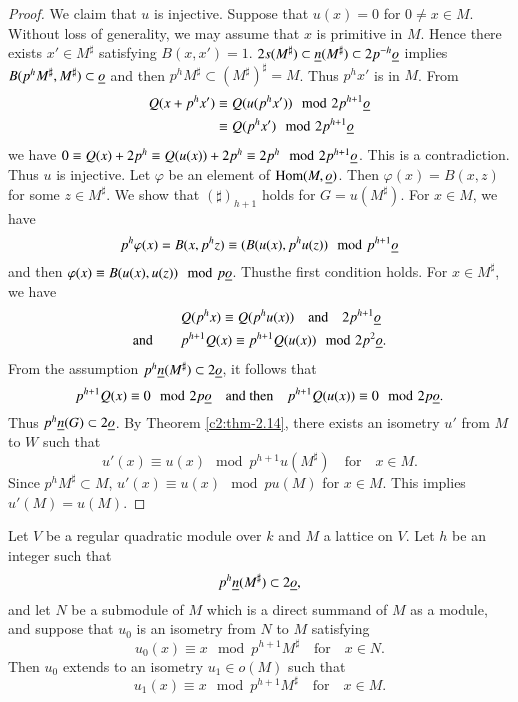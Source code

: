 \begin{proof}
We claim that $u$ is injective. Suppose that $u(x)=0$ for $0\neq x\in
M$. Without loss of generality, we may assume that $x$ is primitive in
$M$. Hence there exists $x'\in M^{\sharp}$ satisfying
$B(x,x')=1$. $2s(M^{\sharp})\subset\underline{n}(M^{\sharp})\subset
2p^{-h}\underline{o}$ implies $B(p^{h}M^{\sharp},M^{\sharp})\subset\underline{o}$
and then $p^{h}M^{\sharp}\subset (M^{\sharp})^{\sharp}=M$. Thus
$p^{h}x'$ is in $M$. From
\begin{align*}
Q(x+p^{h}x') &\equiv Q(u(p^{h}x'))\mod 2p^{h+1}\underline{o}\\
&\equiv Q(p^{h}x')\mod 2p^{h+1}\underline{o}
\end{align*}
we have $0\equiv Q(x)+2p^{h}\equiv Q(u(x))+2p^{h}\equiv 2p^{h}\mod
2p^{h+1}\underline{o}$. This is a contradiction. Thus $u$ is injective. Let
$\varphi$ be an element of $\operatorname{Hom}(M,\underline{o})$. Then $\varphi(x)=B(x,z)$
for some $z\in M^{\sharp}$. We show that $(\sharp)_{h+1}$ holds for
$G=u(M^{\sharp})$. For $x\in M$, we have
$$
p^{h}\varphi(x)=B(x,p^{h}z)\equiv (B(u(x),p^{h}u(z))\mod p^{h+1}\underline{o}
$$
and then $\varphi(x)\equiv B(u(x),u(z))\mod
p\underline{o}$. Thus\pageoriginale the first condition holds. For $x\in
M^{\sharp}$, we have
\begin{align*}
& Q(p^{h}x)\equiv Q(p^{h}u(x))\quad\text{and}\quad 2p^{h+1}\underline{o}\\
\text{and}\qquad & p^{h+1}Q(x)\equiv p^{h+1}Q(u(x))\mod 2p^{2}\underline{o}.
\end{align*}
From the assumption $p^{h}\underline{n}(M^{\sharp})\subset 2\underline{o}$, it
follows that
$$
p^{h+1}Q(x)\equiv 0\mod 2p\underline{o}\quad\text{and then}\quad
p^{h+1}Q(u(x))\equiv 0\mod 2p\underline{o}.
$$
Thus $p^{h}\underline{n}(G)\subset 2\underline{o}$. By Theorem \ref{c2:thm-2.14}, there
exists an isometry $u'$ from $M$ to $W$ such that
$$
u'(x)\equiv u(x)\mod p^{h+1}u(M^{\sharp})\quad\text{for}\quad x\in M.
$$
Since $p^{h}M^{\sharp}\subset M$, $u'(x)\equiv u(x)\mod pu(M)$ for
$x\in M$. This implies $u'(M)=u(M)$.
\end{proof}

\begin{cor}\label{c2:coro-2}
Let $V$ be a regular quadratic module over $k$ and $M$ a lattice on
$V$. Let $h$ be an integer such that
$$
p^{h}\underline{n}(M^{\sharp})\subset 2\underline{o},
$$
and let $N$ be a submodule of $M$ which is a direct summand of $M$ as
a module, and suppose that $u_{0}$ is an isometry from $N$ to $M$
satisfying
$$
u_{0}(x)\equiv x\mod p^{h+1}M^{\sharp}\quad\text{for}\quad x\in N.
$$
Then $u_{0}$ extends to an isometry $u_{1}\in o(M)$ such that
$$
u_{1}(x)\equiv x\mod p^{h+1}M^{\sharp}\quad\text{for}\quad x\in M.
$$\pageoriginale
\end{cor}

